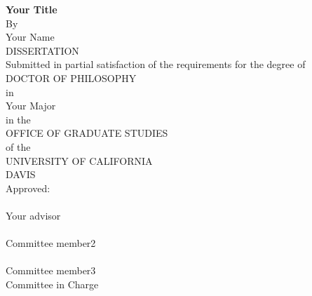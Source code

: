 \begin{center}
   \null\vfill
   \textbf{%
      Your Title
   }%
   \\
   \bigskip
   By \\
   \bigskip
   Your Name \\
   DISSERTATION \\
   \bigskip
   Submitted in partial satisfaction of the requirements for the
   degree of \\
   \bigskip
   DOCTOR OF PHILOSOPHY \\
   \bigskip
   in \\
   \bigskip
   Your Major \\
   \bigskip
   in the \\
   \bigskip
   OFFICE OF GRADUATE STUDIES \\
   \bigskip        
   of the \\
   \bigskip
   UNIVERSITY OF CALIFORNIA \\
   \bigskip
   DAVIS \\
   \bigskip
   Approved: \\
   \bigskip
   \bigskip
   \makebox[3in]{\hrulefill} \\
   Your advisor \\
   \bigskip
   \bigskip
   \makebox[3in]{\hrulefill} \\
   Committee member2 \\
   \bigskip
   \bigskip
   \makebox[3in]{\hrulefill} \\
   Committee member3 \\
   \bigskip
   Committee in Charge \\
    \\
   \vfill
\end{center}
